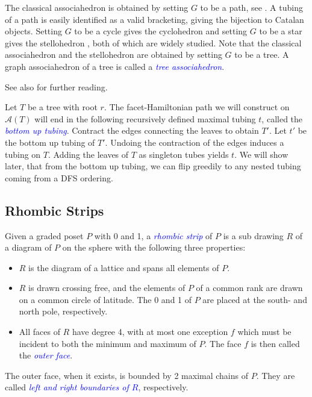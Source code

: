 \documentclass[fontsize=11pt,a4paper,DIV=12]{scrartcl}
\newcommand{\defn}[1]{\textsl{\textcolor{Blue}{#1}}}
\begin{document}
The classical associahedron is obtained by setting $G$ to be a path, see . A tubing of a path is easily identified as a valid bracketing, giving the bijection to Catalan objects. Setting $G$ to be a cycle gives the cyclohedron \cite{Cyclohedra, Cyclohedra_diameter} and setting $G$ to be a star gives the stellohedron \cite{stellohedron}, both of which are widely studied. Note that the classical associahedron and the stellohedron are obtained by setting $G$ to be a tree. A graph associahedron of a tree is called a \defn{tree associahedron}.

 See also \cite{Graph_associahedra_diameter, Graph_associahedra_general, graph_properties_graph_associahedra, Graph_associahedra_realization, Elimination_trees} for further reading.

 Let $T$ be a tree with root $r$. The facet-Hamiltonian path we will construct on $\mathcal A(T)$ will end in the following recursively defined maximal tubing $t$, called the \defn{bottom up tubing}. Contract the edges connecting the leaves to obtain $T'$. Let $t'$ be the bottom up tubing of $T'$. Undoing the contraction of the edges induces a tubing on $T$. Adding the leaves of $T$ as singleton tubes yields $t$. We will show later, that from the bottom up tubing, we can flip greedily to any nested tubing coming from a DFS ordering.

\subsection{Rhombic Strips}

    Given a graded poset $P$ with 0 and 1, a \defn{rhombic strip} of $P$ is a sub drawing $R$ of a diagram of $P$ on the sphere with the following three properties:
\begin{itemize}
    \item $R$ is the diagram of a lattice and spans all elements of $P$.
    \item $R$ is drawn crossing free, and the elements of $P$ of a common rank are drawn on a common circle of latitude. The 0 and 1 of $P$ are placed at the south- and north pole, respectively.
    \item All faces of $R$ have degree 4, with at most one exception $f$ which must be incident to both the minimum and maximum of $P$. The face $f$ is then called the \defn{outer face}.
\end{itemize}

The outer face, when it exists, is bounded by 2 maximal chains of $P$. They are called \defn{left and right boundaries of $R$}, respectively.
\end{document}
